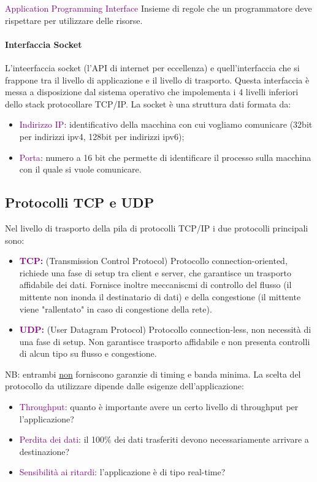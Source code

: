 \begin{definition}[API]
    \textcolor{purple}{Application Programming Interface} Insieme di regole che un programmatore deve rispettare per utilizzare delle risorse.
\end{definition}

\paragraph{Interfaccia Socket} L'inteerfaccia socket (l'API di internet per eccellenza) e quell'interfaccia che si frappone tra il livello di applicazione e il livello di trasporto. Questa interfaccia è messa a disposizione dal sistema operativo che impolementa i 4 livelli inferiori dello stack protocollare TCP/IP.
La socket è una struttura dati formata da:
\begin{itemize}
    \item \textcolor{purple}{Indirizzo IP}: identificativo della macchina con cui vogliamo comunicare (32bit per indirizzi ipv4, 128bit per indirizzi ipv6);
    \item \textcolor{purple}{Porta}: numero a 16 bit che permette di identificare il processo sulla macchina con il quale si vuole comunicare.
\end{itemize} 

\subsection{Protocolli TCP e UDP}
Nel livello di trasporto della pila di protocolli TCP/IP i due protocolli principali sono:
\begin{itemize}
    \item \textbf{\textcolor{purple}{TCP:}} (Transmission Control Protocol) Protocollo connection-oriented, richiede una fase di setup tra client e server, che garantisce un trasporto affidabile dei dati. Fornisce inoltre meccaniscmi di controllo del flusso (il mittente non inonda il destinatario di dati) e della congestione (il mittente viene "rallentato" in caso di congestione della rete).
    \item \textbf{\textcolor{purple}{UDP:}} (User Datagram Protocol) Protocollo connection-less, non necessità di una fase di setup. Non garantisce trasporto affidabile e non presenta controlli di alcun tipo su flusso e congestione.
\end{itemize}
NB: entrambi \underline{non} forniscono garanzie di timing e banda minima.
\newline
\newline La scelta del protocollo da utilizzare dipende dalle esigenze dell'applicazione:
\begin{itemize}
    \item \textcolor{purple}{Throughput}: quanto è importante avere un certo livello di throughput per l'applicazione?
    \item \textcolor{purple}{Perdita dei dati}: il 100$\%$ dei dati trasferiti devono necessariamente arrivare a destinazione?
    \item \textcolor{purple}{Sensibilità ai ritardi}: l'applicazione è di tipo real-time?
\end{itemize}

